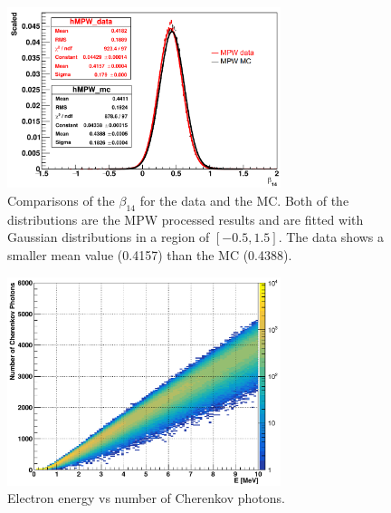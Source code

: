 \begin{figure}[htbp]
	\centering
	\includegraphics[width=8cm]{N16FitMPW_beta14_107055.png}
	\caption{Comparisons of the $\beta_{14}$ for the data and the MC. Both of the distributions are the MPW processed results and are fitted with Gaussian distributions in a region of $[-0.5,1.5]$. The data shows a smaller mean value (0.4157) than the MC (0.4388).}
	\label{N16beta14MPW}
\end{figure}

\begin{figure}[htbp]
	\centering
	\includegraphics[width=8cm]{2dmap_EvsNphoton.png}
	\caption{Electron energy vs number of Cherenkov photons.}
	\label{N16energyMap}
\end{figure}

